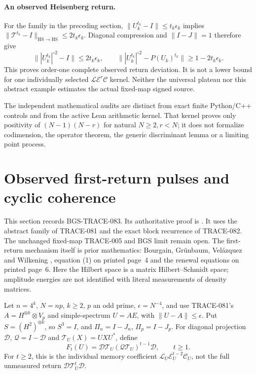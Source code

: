 \paragraph{An observed Heisenberg return.}
For the family in the preceding section,
\(\|U_k^{t_k}-I\|\le t_k\epsilon_k\) implies
\(\|\mathcal T^{t_k}-I\|_{\mathrm{HS}\to\mathrm{HS}}
 \le2t_k\epsilon_k\).
Diagonal compression and \(\|I-J\|=1\) therefore give
\[
\bigl\||U_k^{t_k}|^{\circ2}-I\bigr\|\le2t_k\epsilon_k,\qquad
\bigl\||U_k^{t_k}|^{\circ2}-P(U_k)^{t_k}\bigr\|
       \ge1-2t_k\epsilon_k .
\]
This proves order-one complete observed return deviation.  It is not
a lower bound for one individually selected
\(\mathcal L\mathcal E^r\mathcal C\) kernel.  Neither the universal
plateau nor this abstract example estimates the actual fixed-map
signed source.

The independent mathematical audits are distinct from exact finite
Python/C++ controls and from the active Lean arithmetic kernel.
That kernel proves only positivity of \((N-1)(N-r)\) for natural
\(N\ge2,r<N\); it does not formalize codimension, the operator theorem,
the generic discriminant lemma or a limiting point process.

\section{Observed first-return pulses and cyclic coherence}
\label{sec:observed-first-return-20261014}

This section records BGS-TRACE-083. Its authoritative proof is
.
It uses the abstract family of TRACE-081 and the exact block recurrence
of TRACE-082. The unchanged fixed-map TRACE-005 and BGS limit remain open.
The first-return mechanism itself is prior mathematics:
Bourgain, Gr\"unbaum, Vel\'azquez and Wilkening
\cite{BourgainGrunbaumVelazquezWilkening2013Returns}, equation (1) on
printed page~4 and the renewal equations on printed page~6.
Here the Hilbert space is a matrix Hilbert--Schmidt space; amplitude
energies are not identified with literal measurements of density matrices.

Let \(n=4^k\), \(N=np\), \(k\ge2\), \(p\) an odd prime,
\(\epsilon=N^{-4}\), and use TRACE-081's
\(A=H^{\otimes k}\otimes V_p\) and simple-spectrum \(U=AE\),
with \(\|U-A\|\le\epsilon\).
Put \(S=(H^2)^{\otimes k}\), so \(S^3=I\), and
\(\Pi_n=I-J_n\), \(\Pi_p=I-J_p\).
For diagonal projection \(\mathcal D\), \(\mathcal Q=I-\mathcal D\)
and \(\mathcal T_U(X)=UXU^*\), define
\[
 F_t(U)=\mathcal D\mathcal T_U
           (\mathcal Q\mathcal T_U)^{t-1}\mathcal D,\qquad t\ge1.
\]
For \(t\ge2\), this is the individual memory coefficient
\(\mathcal L_U\mathcal E_U^{t-2}\mathcal C_U\), not the full
unmeasured return \(\mathcal D\mathcal T_U^t\mathcal D\).

